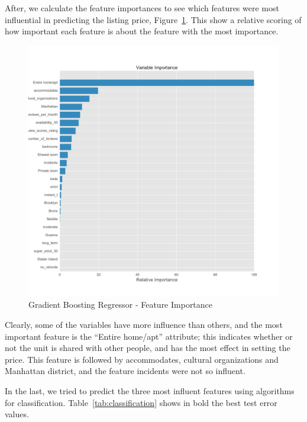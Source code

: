 \documentclass[sigconf]{acmart}
\begin{document}
After, we calculate the feature importances to see which features were most influential in predicting the listing price, Figure~\ref{fig:featureimportanc_gridSearchCVprice}. This show a relative scoring of how important each feature is about the feature with the most importance.

\begin{figure}[!htpb]
	\centering
	\includegraphics[width=\linewidth]{images/feature_importance_gridSearchCV_price}
	\caption{Gradient Boosting Regressor - Feature Importance}
	\label{fig:featureimportanc_gridSearchCVprice}
\end{figure}

Clearly, some of the variables have more influence than others, and the most important feature is the ``Entire home/apt'' attribute; this indicates whether or not the unit is shared with other people, and has the most effect in setting the price. This feature is followed by accommodates, cultural organizations and Manhattan district, and the feature incidents were not so influent.

In the last, we tried to predict the three most influent features using algorithms for classification. Table~\ref{tab:classification} shows in bold the best test error values.
\end{document}
